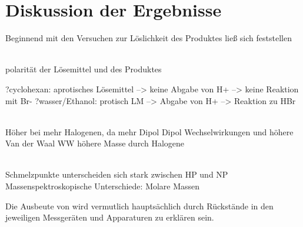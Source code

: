 \section{Diskussion der Ergebnisse}
\label{sec:diskussion}

Beginnend mit den Versuchen zur Löslichkeit des Produktes ließ sich feststellen

\\
polarität der Lösemittel und des Produktes

?cyclohexan: aprotisches Lösemittel --> keine Abgabe von H+ --> keine Reaktion mit Br-
?wasser/Ethanol: protisch LM --> Abgabe von H+ --> Reaktion zu HBr

\\
Höher bei mehr Halogenen, da mehr Dipol Dipol Wechselwirkungen und höhere Van der Waal WW höhere Masse durch Halogene

\\
Schmelzpunkte unterscheiden sich stark zwischen HP und NP
Massenspektroskopische Unterschiede: Molare Massen

Die Ausbeute von  wird vermutlich hauptsächlich durch Rückstände in den jeweiligen Messgeräten und Apparaturen zu erklären sein. \\ 

